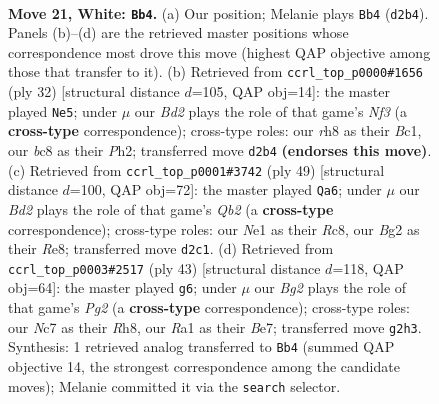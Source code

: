 \documentclass[11pt]{article}
\begin{document}
\clearpage

\begin{figure}[p]\centering
\begin{subfigure}{0.46\textwidth}\centering
\resizebox{\linewidth}{!}{%
\newchessgame
\chessboard[
  setfen={r1b4r/1pN2k2/1nn5/2b3pp/7q/3PpP2/PQ1B2B1/R3NRK1 w - - 0 21},
  showmover=false,
  pgfstyle=straightmove, color=movearrow, markmove={d2-b4}
]}
\caption{}
\end{subfigure}\hfill
\begin{subfigure}{0.46\textwidth}\centering
\resizebox{\linewidth}{!}{%
\newchessgame
\chessboard[
  setfen={r1b1r1k1/ppb3p1/2n4p/5q2/3P3Q/N1P2N2/P5PP/R1B2RK1 w - - 0 17},
  showmover=false,
  pgfstyle=straightmove, color=movearrow, markmove={f3-e5}
]}
\caption{}
\end{subfigure}
\\[4pt]
\begin{subfigure}{0.46\textwidth}\centering
\resizebox{\linewidth}{!}{%
\newchessgame
\chessboard[
  setfen={2r1rbk1/1q3ppp/2bp4/3Nn3/PR1BP3/7Q/1P4PP/1B3R1K b - - 0 25},
  showmover=false,
  pgfstyle=straightmove, color=movearrow, markmove={b7-a6}
]}
\caption{}
\end{subfigure}\hfill
\begin{subfigure}{0.46\textwidth}\centering
\resizebox{\linewidth}{!}{%
\newchessgame
\chessboard[
  setfen={3rk2r/2q1bpp1/p2p1n2/1p2nQ2/4P2P/P1N3B1/1PPRB1K1/5R2 b k - 0 22},
  showmover=false,
  pgfstyle=straightmove, color=movearrow, markmove={g7-g6}
]}
\caption{}
\end{subfigure}
\caption{\textbf{Move 21, White: \texttt{Bb4}.} (a) Our position; Melanie plays \texttt{Bb4} (\texttt{d2b4}). Panels (b)--(d) are the retrieved master positions whose correspondence most drove this move (highest QAP objective among those that transfer to it). (b) Retrieved from \texttt{ccrl\_top\_p0000\#1656} (ply 32) [structural distance $d$=105, QAP obj=14]: the master played \texttt{Ne5}; under $\mu$ our \emph{Bd2} plays the role of that game's \emph{Nf3} (a \textbf{cross-type} correspondence); cross-type roles: our \emph{r}h8 as their \emph{B}c1, our \emph{b}c8 as their \emph{P}h2; transferred move \texttt{d2b4} \textbf{(endorses this move)}. (c) Retrieved from \texttt{ccrl\_top\_p0001\#3742} (ply 49) [structural distance $d$=100, QAP obj=72]: the master played \texttt{Qa6}; under $\mu$ our \emph{Bd2} plays the role of that game's \emph{Qb2} (a \textbf{cross-type} correspondence); cross-type roles: our \emph{N}e1 as their \emph{R}c8, our \emph{B}g2 as their \emph{R}e8; transferred move \texttt{d2c1}. (d) Retrieved from \texttt{ccrl\_top\_p0003\#2517} (ply 43) [structural distance $d$=118, QAP obj=64]: the master played \texttt{g6}; under $\mu$ our \emph{Bg2} plays the role of that game's \emph{Pg2} (a \textbf{cross-type} correspondence); cross-type roles: our \emph{N}c7 as their \emph{R}h8, our \emph{R}a1 as their \emph{B}e7; transferred move \texttt{g2h3}. Synthesis: 1 retrieved analog transferred to \texttt{Bb4} (summed QAP objective 14, the strongest correspondence among the candidate moves); Melanie committed it via the \texttt{search} selector.}
\label{fig:thought-m40}
\end{figure}
\end{document}
